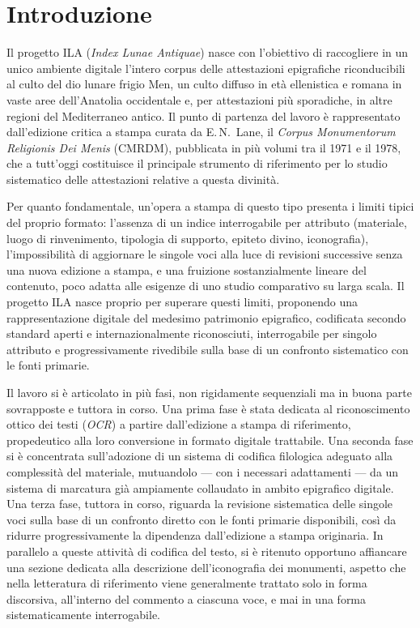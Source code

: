 \documentclass[11pt,a4paper]{article}
\begin{document}
\vspace{1em}

\section{Introduzione}

Il progetto ILA (\textit{Index Lunae Antiquae}) nasce con l'obiettivo di
raccogliere in un unico ambiente digitale l'intero corpus delle
attestazioni epigrafiche riconducibili al culto del dio lunare frigio
Men, un culto diffuso in età ellenistica e romana in vaste aree
dell'Anatolia occidentale e, per attestazioni più sporadiche, in altre
regioni del Mediterraneo antico. Il punto di partenza del lavoro è
rappresentato dall'edizione critica a stampa curata da E.\,N.\ Lane, il
\textit{Corpus Monumentorum Religionis Dei Menis} (CMRDM), pubblicata in
più volumi tra il 1971 e il 1978, che a tutt'oggi costituisce il
principale strumento di riferimento per lo studio sistematico delle
attestazioni relative a questa divinità.

Per quanto fondamentale, un'opera a stampa di questo tipo presenta i
limiti tipici del proprio formato: l'assenza di un indice interrogabile
per attributo (materiale, luogo di rinvenimento, tipologia di supporto,
epiteto divino, iconografia), l'impossibilità di aggiornare le singole
voci alla luce di revisioni successive senza una nuova edizione a
stampa, e una fruizione sostanzialmente lineare del contenuto, poco
adatta alle esigenze di uno studio comparativo su larga scala. Il
progetto ILA nasce proprio per superare questi limiti, proponendo una
rappresentazione digitale del medesimo patrimonio epigrafico, codificata
secondo standard aperti e internazionalmente riconosciuti, interrogabile
per singolo attributo e progressivamente rivedibile sulla base di un
confronto sistematico con le fonti primarie.

Il lavoro si è articolato in più fasi, non rigidamente sequenziali ma
in buona parte sovrapposte e tuttora in corso. Una prima fase è stata
dedicata al riconoscimento ottico dei testi (\textit{OCR}) a partire
dall'edizione a stampa di riferimento, propedeutico alla loro conversione
in formato digitale trattabile. Una seconda fase si è concentrata
sull'adozione di un sistema di codifica filologica adeguato alla
complessità del materiale, mutuandolo --- con i necessari adattamenti ---
da un sistema di marcatura già ampiamente collaudato in ambito
epigrafico digitale. Una terza fase, tuttora in corso, riguarda la
revisione sistematica delle singole voci sulla base di un confronto
diretto con le fonti primarie disponibili, così da ridurre
progressivamente la dipendenza dall'edizione a stampa originaria. In
parallelo a queste attività di codifica del testo, si è ritenuto
opportuno affiancare una sezione dedicata alla descrizione
dell'iconografia dei monumenti, aspetto che nella letteratura di
riferimento viene generalmente trattato solo in forma discorsiva,
all'interno del commento a ciascuna voce, e mai in una forma
sistematicamente interrogabile.
\end{document}
